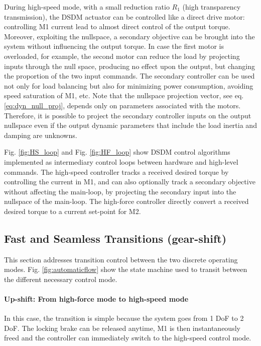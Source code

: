 During high-speed mode, with a small reduction ratio $R_1$ (high transparency transmission), the DSDM actuator can be controlled like a direct drive motor: controlling M1 current lead to almost direct control of the output torque. Moreover, exploiting the nullspace, a secondary objective can be brought into the system without influencing the output torque. In case the first motor is overloaded, for example, the second motor can reduce the load by projecting inputs through the null space, producing no effect upon the output, but changing the proportion of the two input commands. The secondary controller can be used not only for load balancing but also for minimizing power consumption, avoiding speed saturation of M1, etc. Note that the nullspace projection vector, see eq.\eqref{eq:dyn_null_proj}, depends only on parameters associated with the motors. Therefore, it is possible to project the secondary controller inputs on the output nullspace even if the output dynamic parameters that include the load inertia and damping are unknowns. 

Fig. \ref{fig:HS_loop} and Fig. \ref{fig:HF_loop} show DSDM control algorithms implemented as intermediary control loops between hardware and high-level commands. The high-speed controller tracks a received desired torque by controlling the current in M1, and can also optionally track a secondary objective without affecting the main-loop, by projecting the secondary input into the nullspace of the main-loop. The high-force controller directly convert a received desired torque to a current set-point for M2.


\subsection{Fast and Seamless Transitions (gear-shift)}

This section addresses transition control between the two discrete operating modes. Fig. \ref{fig:automaticflow} show the state machine used to transit between the different necessary control mode.




\paragraph{Up-shift: From high-force mode to high-speed mode}
In this case, the transition is simple because the system goes from 1 DoF to 2 DoF. The locking brake can be released anytime, M1 is then instantaneously freed and the controller can immediately switch to the high-speed control mode.
%

